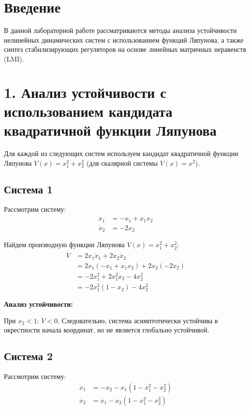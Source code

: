 \setcounter{secnumdepth}{-1} %

\section{Введение}

В данной лабораторной работе рассматриваются методы анализа 
устойчивости нелинейных динамических систем с использованием 
функций Ляпунова, а также синтез стабилизирующих регуляторов 
на основе линейных матричных неравенств (LMI).

\section{1. Анализ устойчивости с использованием кандидата квадратичной функции Ляпунова}

Для каждой из следующих систем используем кандидат квадратичной 
функции Ляпунова $V(x) = x_1^2 + x_2^2$ (для скалярной системы $V(x) = x^2$).

\subsection*{Система 1}

Рассмотрим систему:
\begin{align*}
\dot{x}_1 &= -x_1 + x_1 x_2 \\
\dot{x}_2 &= -2x_2
\end{align*}

Найдем производную функции Ляпунова $V(x) = x_1^2 + x_2^2$:
\begin{align*}
\dot{V} &= 2x_1 \dot{x}_1 + 2x_2 \dot{x}_2 \\
&= 2x_1(-x_1 + x_1 x_2) + 2x_2(-2x_2) \\
&= -2x_1^2 + 2x_1^2 x_2 - 4x_2^2 \\
&= -2x_1^2 (1 - x_2) - 4x_2^2
\end{align*}

\textbf{Анализ устойчивости:}

При $x_2 < 1$: $\dot{V} < 0$. Следовательно, система асимптотически
устойчива в окрестности начала координат, но не является глобально устойчивой.

\subsection{Система 2}

Рассмотрим систему:
\begin{align*}
\dot{x}_1 &= -x_2 - x_1(1 - x_1^2 - x_2^2) \\
\dot{x}_2 &= x_1 - x_2(1 - x_1^2 - x_2^2)
\end{align*}

